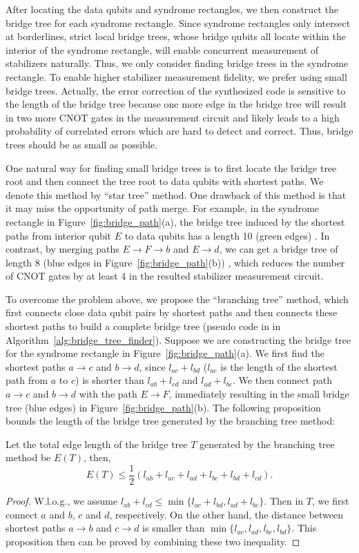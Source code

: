 After locating the data qubits and syndrome rectangles, we then construct the bridge tree for each syndrome rectangle.
Since syndrome rectangles only intersect at borderlines, strict local bridge trees, whose bridge qubits all locate within the interior of the syndrome rectangle, will enable concurrent measurement of stabilizers naturally. Thus, we only consider finding bridge trees in the syndrome rectangle. %
To enable higher stabilizer measurement fidelity, we prefer using small bridge trees. 
Actually, the error correction of the synthesized code is sensitive to the length of the bridge tree because one more edge in the bridge tree will result in two more CNOT gates in the measurement circuit and likely leads to a high probability of correlated errors which are hard to detect and correct. Thus, 
bridge trees should be as small as possible.

One natural way for finding small bridge trees is to first locate the bridge tree root and then connect the tree root to data qubits with shortest paths. We denote this method by ``{star tree}'' method. One drawback of this method is that it may miss the opportunity of path merge.
 For example, in the syndrome rectangle in Figure~\ref{fig:bridge_path}(a), the bridge tree induced by the shortest paths from interior qubit $E$ to data qubits has a length 10 (green edges) . In contrast, by merging paths $E\to F\to b$ and $E \to d$, we can get a bridge tree of length 8 (blue edges in Figure~\ref{fig:bridge_path}(b)) , which reduces the number of CNOT gates by at least 4 in the resulted stabilizer measurement circuit.

To overcome the problem above, we propose the ``{branching tree}'' method, which first connects close data qubit pairs by shortest paths and then connects these shortest paths to build a complete bridge tree (pseudo code in in Algorithm~\ref{alg:bridge_tree_finder}). Suppose we are constructing the bridge tree for the syndrome rectangle in Figure~\ref{fig:bridge_path}(a). We first find the shortest paths $a \to c$ and $b \to d$, since $l_{ac} + l_{bd}$ ($l_{ac}$ is the length of the shortest path from $a$ to $c$) is shorter than $l_{ab} + l_{cd}$ and $l_{ad} + l_{bc}$. We then connect path $a\to c$ and $b \to d$ with the path $E \to F$,  immediately resulting in the small bridge tree (blue edges) in Figure~\ref{fig:bridge_path}(b). The following proposition bounds the length of the bridge tree generated by the branching tree method:

\begin{prop}\label{prop:bridge_perf}
Let the total edge length of the bridge tree $T$ generated by the branching tree method be $E(T)$, then,
$$E(T) \le \frac{1}{2}(l_{ab}+l_{ac}+l_{ad}+l_{bc}+l_{bd}+l_{cd}).$$
\end{prop}
\begin{proof}
W.l.o.g., we assume $l_{ab}+l_{cd} \le \min \{l_{ac} + l_{bd}, l_{ad}+l_{bc}\}$. Then in $T$, we first connect $a$ and $b$, $c$ and $d$, respectively.
On the other hand, the distance between shortest paths $a\to b$ and $c \to d$ is smaller than $\min \{l_{ac}, l_{ad}, l_{bc}, l_{bd}\}$. This proposition then can be proved by combining these two inequality. %
\end{proof}


